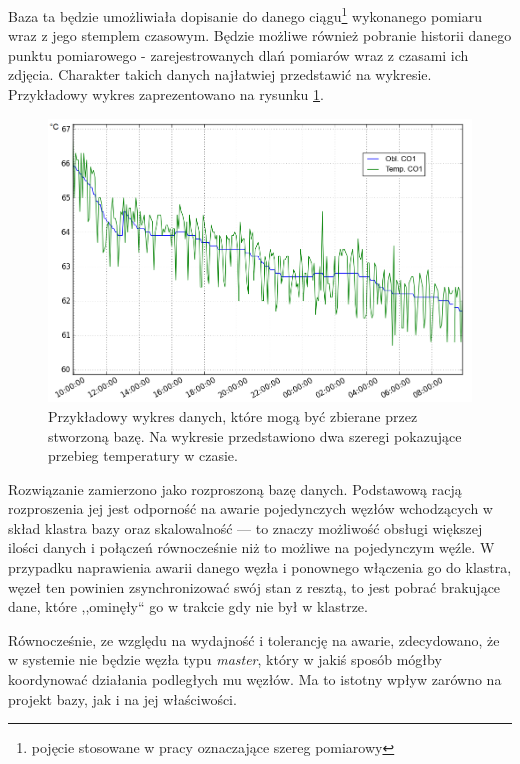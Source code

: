 \documentclass[a4paper,polish,12pt,twoside]{article}
\begin{document}
Baza ta będzie umożliwiała dopisanie do danego ciągu\footnote{pojęcie stosowane w pracy oznaczające szereg pomiarowy} wykonanego pomiaru wraz z jego stemplem czasowym. Będzie możliwe również pobranie historii danego punktu pomiarowego - zarejestrowanych dlań pomiarów wraz z czasami ich zdjęcia. Charakter takich danych najłatwiej przedstawić na wykresie. Przykładowy wykres zaprezentowano na rysunku \ref{fig:sample_plot}.

	\begin{figure}[h]
		\centering \includegraphics[width=15cm]{sample_plot}
		\caption[Przykładowy wykres danych, które mogą być zbierane przez stworzoną bazę]{Przykładowy wykres danych, które mogą być zbierane przez stworzoną bazę. Na wykresie przedstawiono dwa szeregi pokazujące przebieg temperatury w czasie.}
		\label{fig:sample_plot}
	\end{figure}
Rozwiązanie zamierzono jako rozproszoną bazę danych. Podstawową racją rozproszenia jej jest odporność na awarie pojedynczych węzłów wchodzących w skład klastra bazy oraz skalowalność --- to znaczy możliwość obsługi większej ilości danych i połączeń równocześnie niż to możliwe na pojedynczym węźle. W przypadku naprawienia awarii danego węzła i ponownego włączenia go do klastra, węzeł ten powinien zsynchronizować swój stan z resztą, to jest pobrać brakujące dane, które ,,ominęły`` go w trakcie gdy nie był w klastrze.

Równocześnie, ze względu na wydajność i tolerancję na awarie, zdecydowano, że w systemie nie będzie węzła typu \textit{master}, który w jakiś sposób mógłby koordynować działania podległych mu węzłów. Ma to istotny wpływ zarówno na projekt bazy, jak i na jej właściwości.
\end{document}
